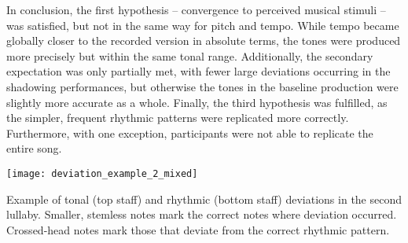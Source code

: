 In conclusion, the first hypothesis -- convergence to perceived musical stimuli -- was satisfied, but not in the same way for pitch and tempo.
While tempo became globally closer to the recorded version in absolute terms, the tones were produced more precisely but within the same tonal range.
Additionally, the secondary expectation was only partially met, with fewer large deviations occurring in the shadowing performances, but otherwise the tones in the baseline production were slightly more accurate as a whole.
Finally, the third hypothesis was fulfilled, as the simpler, frequent rhythmic patterns were replicated more correctly.
Furthermore, with one exception, participants were not able to replicate the entire song.


\begin{snippet}[h]
	\centering
	\texttt{[image: deviation\_example\_2\_mixed]}
	\caption{Example of tonal (top staff) and rhythmic (bottom staff) deviations in the second lullaby.
			Smaller, stemless notes mark the correct notes where deviation occurred.
			Crossed-head notes mark those that deviate from the correct rhythmic pattern.}
	\label{snippet:deviation_example}
\end{snippet}
